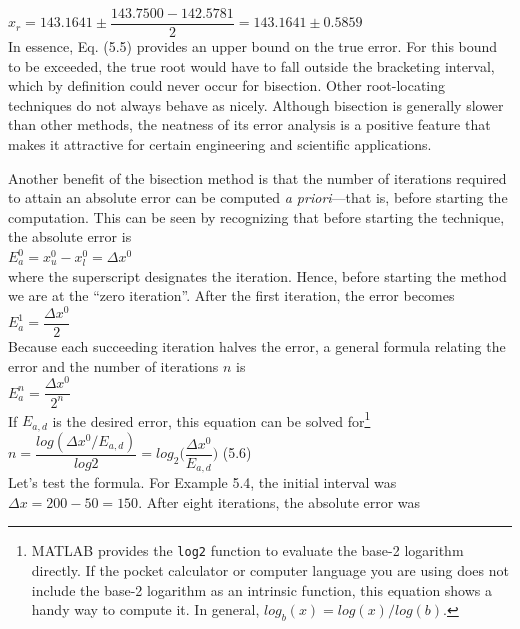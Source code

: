 \documentclass[../main.tex]{subfiles}
\begin{document}
$x_r = 143.1641\pm\dfrac{143.7500-142.5781}{2}=143.1641\pm 0.5859$\\

In essence, Eq. (5.5) provides an upper bound on the true error. For this bound to be
exceeded, the true root would have to fall outside the bracketing interval, which by definition
could never occur for bisection. Other root-locating techniques do not always behave
as nicely. Although bisection is generally slower than other methods, the neatness of its
error analysis is a positive feature that makes it attractive for certain engineering and
scientific applications.

Another benefit of the bisection method is that the number of iterations required to attain
an absolute error can be computed \emph{a priori}---that is, before starting the computation.
This can be seen by recognizing that before starting the technique, the absolute error is\\

$E^0_a = x^0_u-x^0_l = \Delta x^0$\\

\noindent where the superscript designates the iteration. Hence, before starting the method we are at
the ``zero iteration''. After the first iteration, the error becomes\\

$E^1_a = \dfrac{\Delta x^0}{2}$\\

\noindent Because each succeeding iteration halves the error, a general formula relating the error and
the number of iterations $n$ is\\

$E^n_a = \dfrac{\Delta x^0}{2^n}$\\

\noindent If $E_{a,d}$ is the desired error, this equation can be solved for\footnote{MATLAB provides the \texttt{log2} function to evaluate the base-2 logarithm directly. If the pocket calculator or
computer language you are using does not include the base-2 logarithm as an intrinsic function, this equation
shows a handy way to compute it. In general, $log_b(x) = log(x)/log(b)$.}\\

$n = \dfrac{log(\Delta x^0/E_{a,d})}{log2}=log_2\Big(\dfrac{\Delta x^0}{E_{a,d}}\Big)$
\hfill (5.6)\\

Let's test the formula. For Example 5.4, the initial interval was $\Delta x = 200-50 = 150$.
After eight iterations, the absolute error was\\
\end{document}

